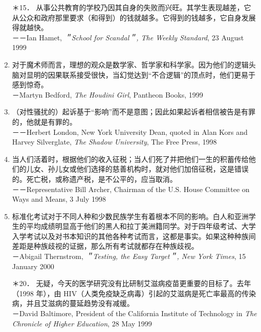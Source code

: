\begin{enumerate}[label=\arabic*., itemsep=1ex, topsep=1ex, start=2]
\item[＊15．] 从事公共教育的学校乃因其自身的失败而兴旺。其学生表现越差，它从公众和政府那里要求（和得到）的钱就越多。它得到的钱越多，它自身发展得就越快。\\
    \null\hspace{\parindent}－－Ian Hamet, \textit{＂School for Scandal＂, The Weekly Standard}, 23 August 1999
\item 对于魔术师而言，理想的观众是数学家、哲学家和科学家。因为他们的逻辑头脑对显明的因果联系接受很快，当幻觉达到“不合逻辑”的顶点时，他们更易于感到惊奇。\\
    \null\hspace{\parindent}－Martyn Bedford, \textit{The Houdini Girl}, Pantheon Books, 1999
\item （对性骚扰的）起诉基于“影响”而不是意图；因此如果起诉者相信被告是有罪的，他就是有罪的。\\
    \null\hspace{\parindent}－－Herbert London, New York University Dean, quoted in Alan Kors and Harvey Silverglate, \textit{The Shadow University}, The Free Press, 1998
\item 当人们活着时，根据他们的收入征税；当人们死了并把他们一生的积蓄传给他们的儿女、孙儿女或他们选择的慈善机构时，就对他们加倍征税，这是错误的。死亡税，或称遗产税，是不公平的，应当取消。\\
    \null\hspace{\parindent}－－Representative Bill Archer, Chairman of the U.S. House Committee on Ways and Means, 3 July 1998
\item 标准化考试对于不同人种和少数民族学生有着根本不同的影响。白人和亚洲学生的平均成绩明显高于他们的黑人和拉丁美洲籍同学。对于四年级考试、大学入学考试以及对书本知识的其他各种考试而言，这都是事实。如果这种种族间差距是种族歧视的证据，那么所有考试就都存在种族歧视。\\
    \null\hspace{\parindent}－Abigail Thernstrom, \textit{＂Testing, the Easy Target＂, New York Times}, 15 January 2000
\item[＊20．] 无疑，今天的医学研究没有比研制艾滋病疫苗更重要的目标了。去年（1998 年），由 HIV（人类免疫缺乏病毒）引起的艾滋病是死亡率最高的传染病，并且艾滋病的蔓延趋势没有减缓。\\
    \null\hspace{\parindent}－David Baltimore, President of the California Institute of Technology in \textit{The Chronicle of Higher Education}, 28 May 1999
\end{enumerate}

